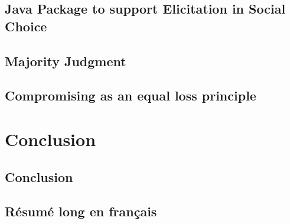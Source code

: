\documentclass[a4paper, 11pt,oneside]{book}
\begin{document}
	\chapter{Java Package to support Elicitation in Social Choice}
		\label{ch:uml}
		
	\chapter{Majority Judgment}
		\label{ch:MJ}
		

	\chapter{Compromising as an equal loss principle}
	\label{ch:compromise}
		

\part{Conclusion}
	\chapter{Conclusion}
		\label{ch:conclusion}
		




\backmatter
{}



 

\chapter{Résumé long en français}
\end{document}
